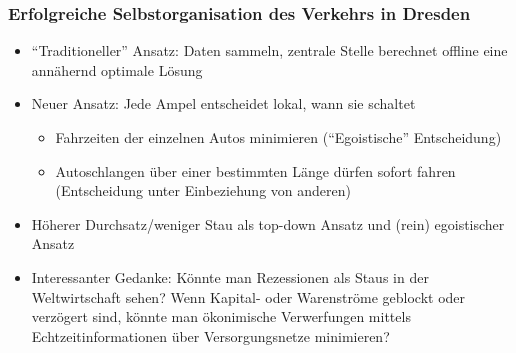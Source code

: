 \begin{frame}
	\frametitle{Erfolgreiche Selbstorganisation des Verkehrs in Dresden}
	\begin{itemize}
		\item
			\enquote{Traditioneller} Ansatz: Daten sammeln, zentrale Stelle berechnet offline eine annähernd optimale Lösung
		\item
			Neuer Ansatz: Jede Ampel entscheidet lokal, wann sie schaltet
			\begin{itemize}
				\item
					Fahrzeiten der einzelnen Autos minimieren (\enquote{Egoistische} Entscheidung)
				\item
					Autoschlangen über einer bestimmten Länge dürfen sofort fahren (Entscheidung unter Einbeziehung von anderen)
			\end{itemize}
		\item
			Höherer Durchsatz/weniger Stau als top-down Ansatz und (rein) egoistischer Ansatz
		\item<2->
			Interessanter Gedanke: Könnte man Rezessionen als Staus in der Weltwirtschaft sehen? Wenn Kapital- oder Warenströme geblockt oder verzögert sind, könnte man ökonimische Verwerfungen mittels Echtzeitinformationen über Versorgungsnetze minimieren?
	\end{itemize}
\end{frame}
